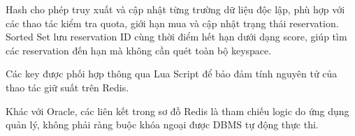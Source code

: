 Hash cho phép truy xuất và cập nhật từng trường dữ liệu độc lập, phù hợp với các thao tác kiểm tra quota, giới hạn mua và cập nhật trạng thái reservation. Sorted Set lưu reservation ID cùng thời điểm hết hạn dưới dạng score, giúp tìm các reservation đến hạn mà không cần quét toàn bộ keyspace.

Các key được phối hợp thông qua Lua Script để bảo đảm tính nguyên tử của thao tác giữ suất trên Redis.

Khác với Oracle, các liên kết trong sơ đồ Redis là tham chiếu logic do ứng dụng quản lý, không phải ràng buộc khóa ngoại được DBMS tự động thực thi.
